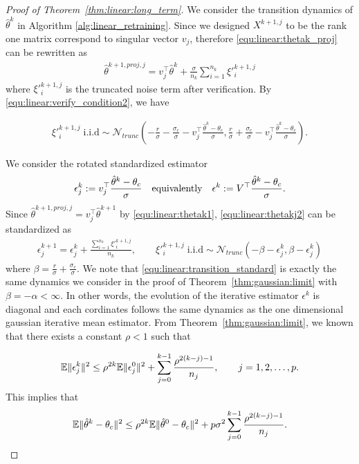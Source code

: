 \begin{proof}[Proof of Theorem~\ref{thm:linear:long_term}]
     
We consider the transition dynamics of $\hat{\theta}^k$ in Algorithm \ref{alg:linear_retraining}.
Since we designed $X^{k+1,j}$ to be the rank one matrix correspond to singular vector $v_j$, therefore \eqref{equ:linear:thetak_proj} can be rewritten as
\begin{align}
    \hat{\theta}^{k+1,proj,j} = v_j^\top \hat{\theta}^k + \frac{\sigma}{n_k} \sum_{i=1}^{n_k} \xi'^{k+1,j}_i \label{equ:linear:thetakj2}
\end{align}
where $\xi'^{k+1,j}_i$ is the truncated noise term after verification. By \eqref{equ:linear:verify_condition2}, we have

\begin{align}
\xi'^{k+1,j}_i \; \text{i.i.d} \sim \mathcal{N}_{trunc}\left(-\frac{r}{\sigma}-\frac{\sigma_c}{\sigma} -v^{\top}_j\frac{\hat{\theta}^k - \theta_c}{\sigma}, \frac{r}{\sigma}+\frac{\sigma_c}{\sigma} -v^{\top}_j\frac{\hat{\theta}^k - \theta_c}{\sigma}\right).
\end{align}

We consider the rotated standardized estimator 
\begin{align}
\epsilon^k_j := v^{\top}_j \frac{\hat{\theta}^k-\theta_c}{\sigma} \quad \text{equivalently} \quad \epsilon^k := V^\top \frac{\hat{\theta}^k-\theta_c}{\sigma}.\notag
\end{align}
Since $\hat{\theta}^{k+1,proj,j} = v_j^{\top}\hat{\theta}^{k+1}$ by \eqref{equ:linear:thetak1}, \eqref{equ:linear:thetakj2} can be standardized as
\begin{align}
    \epsilon^{k+1}_j = \epsilon^k_j + \frac{\sum_{i=1}^{n_k} \xi'^{k+1,j}_i}{n_k}, \qquad \xi'^{k+1,j}_i \; \text{i.i.d} \sim \mathcal{N}_{trunc}\left(-\beta - \epsilon^k_j, \beta - \epsilon^k_j\right)\label{equ:linear:transition_standard}
\end{align}
where $\beta = \frac{r}{\sigma} + \frac{\sigma_c}{\sigma}$. We note that \eqref{equ:linear:transition_standard} is exactly the same dynamics we consider in the proof of Theorem~\ref{thm:gaussian:limit} with $\beta = -\alpha < \infty$.
In  other words, the evolution of the iterative estimator $\epsilon^k$ is diagonal and each cordinates follows the same dynamics as the one dimensional gaussian iterative mean estimator.
From Theorem~\ref{thm:gaussian:limit}, we known that there exists a constant $\rho < 1$ such that

\begin{align}
    \mathbb{E} \|\epsilon^k_j\|^2 \leq \rho^{2k} \mathbb{E}\|\epsilon^0_j\|^2 + \sum_{j=0}^{k-1}\frac{\rho^{2(k-j)-1}}{n_j}, \qquad j = 1,2,\ldots,p.\notag
\end{align}
This implies that
\begin{align}
    \mathbb{E} \|\hat{\theta}^k-\theta_c\|^2 \leq \rho^{2k} \mathbb{E}\|\hat{\theta}^0-\theta_c\|^2 + p\sigma^2\sum_{j=0}^{k-1}\frac{\rho^{2(k-j)-1}}{n_j}.\notag
\end{align}     

\end{proof}


